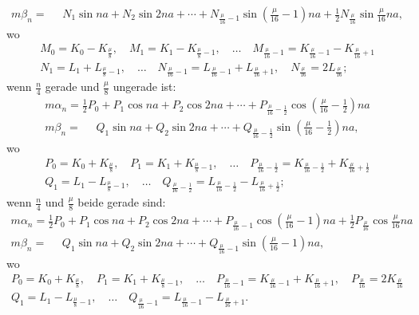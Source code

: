 \begin{landscape}
\[\begin{array}{l}
m\beta_n = \phantom{{}={}} N_1\sin na + N_2\sin 2na + \cdots + N_{\frac{\mu}{16}-1}\sin\left(\frac{\mu}{16}-1\right)na + \tfrac{1}{2}N_{\frac{\mu}{16}}\sin\frac{\mu}{16}na,
\end{array}
\]
wo
\[
\begin{gathered}
M_0 = K_0 - K_{\frac{\mu}{8}}, \quad M_1 = K_1 - K_{\frac{\mu}{8}-1}, \quad \ldots \quad M_{\frac{\mu}{16}-1} = K_{\frac{\mu}{16}-1} - K_{\frac{\mu}{16}+1}\\[4pt]
N_1 = L_1 + L_{\frac{\mu}{8}-1}, \quad \ldots \quad N_{\frac{\mu}{16}-1} = L_{\frac{\mu}{16}-1} + L_{\frac{\mu}{16}+1}, \quad N_{\frac{\mu}{16}} = 2L_{\frac{\mu}{16}};
\end{gathered}
\]
wenn \(\frac{n}{4}\) gerade und \(\frac{\mu}{8}\) ungerade ist:
\[
\tag*{13)}
\begin{array}{l}
m\alpha_n = \tfrac{1}{2}P_0 + P_1\cos na + P_2\cos 2na + \cdots + P_{\frac{\mu}{16}-\frac{1}{2}}\cos\left(\frac{\mu}{16}-\frac{1}{2}\right)na \\[4pt]
m\beta_n = \phantom{{}={}} Q_1\sin na + Q_2\sin 2na + \cdots + Q_{\frac{\mu}{16}-\frac{1}{2}}\sin\left(\frac{\mu}{16}-\frac{1}{2}\right)na,
\end{array}
\]
wo
\[
\begin{gathered}
P_0 = K_0 + K_{\frac{\mu}{8}}, \quad P_1 = K_1 + K_{\frac{\mu}{8}-1}, \quad \ldots \quad P_{\frac{\mu}{16}-\frac{1}{2}} = K_{\frac{\mu}{16}-\frac{1}{2}} + K_{\frac{\mu}{16}+\frac{1}{2}}\\[4pt]
Q_1 = L_1 - L_{\frac{\mu}{8}-1}, \quad \ldots \quad Q_{\frac{\mu}{16}-\frac{1}{2}} = L_{\frac{\mu}{16}-\frac{1}{2}} - L_{\frac{\mu}{16}+\frac{1}{2}};
\end{gathered}
\]
wenn \(\frac{n}{4}\) und \(\frac{\mu}{8}\) beide gerade sind:
\[
\tag*{14)}
\begin{array}{l}
m\alpha_n = \tfrac{1}{2}P_0 + P_1\cos na + P_2\cos 2na + \cdots + P_{\frac{\mu}{16}-1}\cos\left(\frac{\mu}{16}-1\right)na + \tfrac{1}{2}P_{\frac{\mu}{16}}\cos\frac{\mu}{16}na \\[4pt]
m\beta_n = \phantom{{}={}} Q_1\sin na + Q_2\sin 2na + \cdots + Q_{\frac{\mu}{16}-1}\sin\left(\frac{\mu}{16}-1\right)na,
\end{array}
\]
wo
\[
\begin{gathered}
P_0 = K_0 + K_{\frac{\mu}{8}}, \quad P_1 = K_1 + K_{\frac{\mu}{8}-1}, \quad \ldots \quad P_{\frac{\mu}{16}-1} = K_{\frac{\mu}{16}-1} + K_{\frac{\mu}{16}+1}, \quad P_{\frac{\mu}{16}} = 2K_{\frac{\mu}{16}}\\[4pt]
Q_1 = L_1 - L_{\frac{\mu}{8}-1}, \quad \ldots \quad Q_{\frac{\mu}{16}-1} = L_{\frac{\mu}{16}-1} - L_{\frac{\mu}{16}+1}.

\end{gathered}\]
\end{landscape}
